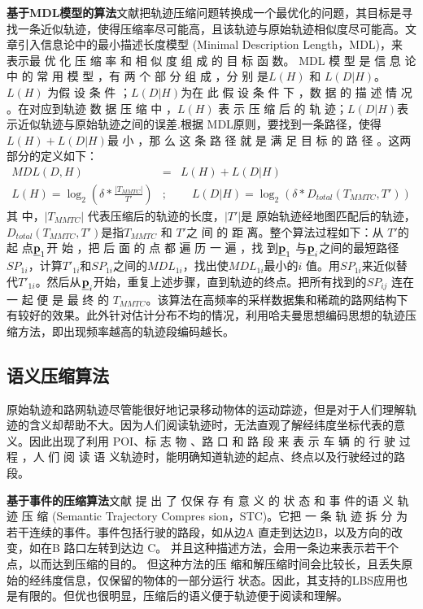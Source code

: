 \textbf{基于MDL模型的算法}文献\cite{DMDL2,MDL1}把轨迹压缩问题转换成一个最优化的问题，其目标是寻找一条近似轨迹，使得压缩率尽可能高，且该轨迹与原始轨迹相似度尽可能高。文章引入信息论中的最小描述长度模型 (Minimal Description Length，MDL)，来 表示最 优 化 压 缩 率 和 相 似 度 组 成 的 目 标 函 数。
MDL 模 型 是 信 息 论 中 的 常 用 模 型 ，有 两 个 部 分 组 成 ，分 别 是$L (H )$ 和 $L (D|H )$。$L (H )$ 为假 设 条 件 ；$L (D|H )$为在 此 假 设 条 件 下 ，数 据 的 描 述 情 况 。在对应到轨迹 数 据 压 缩 中 ，$L (H )$ 表 示 压 缩 后 的 轨 迹；$L (D|H )$表示近似轨迹与原始轨迹之间的误差.根据 MDL原则，要找到一条路径，使得
 $L(H)+L (D|H )$最 小 ，那 么 这 条 路 径 就 是 满 足 目 标 的 路 径 。这两部分的定义如下：
 \begin{eqnarray}\label{eq:MDL}
 MDL(D,H)&=&L(H)+L(D|H) \\
 L(H)=\log_{2}(\delta *\frac{|T_{MMTC}|}{T'}) &;&\quad L(D|H)=\log_{2}(\delta *D_{total}(T_{MMTC},T'))
 \end{eqnarray}
 其 中，$|T_{MMTC}|$  代表压缩后的轨迹的长度，$|T′|$是 原始轨迹经地图匹配后的轨迹，$D_{total}(T_{MMTC},T')$是指$T_{MMTC}$  和 $T′$之 间 的 距 离。整个算法过程如下：从  $T′$的 起 点$\emph{{\textbf{p}}}_{1}$开 始 ，把 后 面 的 点 都 遍 历 一 遍 ，找 到$\emph{{\textbf{p}}}_{1}$ 与$\emph{{\textbf{p}}}_{i}$之间的最短路径$SP_{1i}$，计算$T′_{1i}$和$SP_{1i}$之间的$MDL_{1i}$，找出使$MDL_{1i}$最小的$i$ 值。用$SP_{1i}$来近似替代$T′_{1i}$。然后从$\emph{{\textbf{p}}}_{i}$开始，重复上述步骤，直到轨迹的终点。把所有找到的$SP_{ij}$ 连在一 起 便 是 最 终 的 $T_{MMTC}$。该算法在高频率的采样数据集和稀疏的路网结构下有较好的效果。此外针对估计分布不均的情况，\cite{hufmmanCompres}利用哈夫曼思想编码思想的轨迹压缩方法，即出现频率越高的轨迹段编码越长。
 
 \subsection{语义压缩算法}
 原始轨迹和路网轨迹尽管能很好地记录移动物体的运动踪迹，但是对于人们理解轨迹的含义却帮助不大。因为人们阅读轨迹时，无法直观了解经纬度坐标代表的意义。因此出现了利用 POI、标 志 物 、路 口 和 路 段 来 表 示 车 辆 的 行 驶 过 程 ，人 们 阅 读 语 义轨迹时，能明确知道轨迹的起点、终点以及行驶经过的路段。

\textbf{基于事件的压缩算法}文献\cite{Sementick,RichterSL12} 提 出 了 仅保 存 有 意 义 的 状 态 和 事 件的语 义 轨 迹 压 缩 (Semantic Trajectory Compres sion，STC)。它把 一 条 轨 迹 拆 分 为 若干连续的事件。事件包括行驶的路段，如从边A 直走到达边B，以及方向的改变，如在B 路口左转到达边 C。
并且这种描述方法，会用一条边来表示若干个点，以而达到压缩的目的。
但这种方法的压 缩和解压缩时间会比较长，且丢失原始的经纬度信息，仅保留的物体的一部分运行 状态。因此，其支持的LBS应用也是有限的。但优也很明显，压缩后的语义便于轨迹便于阅读和理解。

